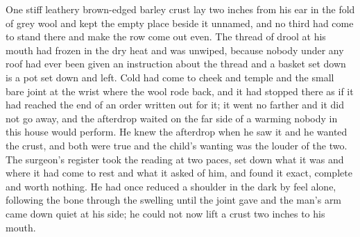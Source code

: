 One stiff leathery brown-edged barley crust lay two inches from his ear in the fold of grey wool and kept the empty place beside it unnamed, and no third had come to stand there and make the row come out even. The thread of drool at his mouth had frozen in the dry heat and was unwiped, because nobody under any roof had ever been given an instruction about the thread and a basket set down is a pot set down and left. Cold had come to cheek and temple and the small bare joint at the wrist where the wool rode back, and it had stopped there as if it had reached the end of an order written out for it; it went no farther and it did not go away, and the afterdrop waited on the far side of a warming nobody in this house would perform. He knew the afterdrop when he saw it and he wanted the crust, and both were true and the child's wanting was the louder of the two. The surgeon's register took the reading at two paces, set down what it was and where it had come to rest and what it asked of him, and found it exact, complete and worth nothing. He had once reduced a shoulder in the dark by feel alone, following the bone through the swelling until the joint gave and the man's arm came down quiet at his side; he could not now lift a crust two inches to his mouth.

